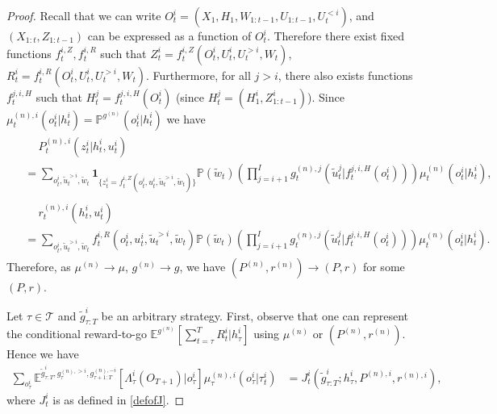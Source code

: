\documentclass[pdflatex,sn-basic]{sn-jnl}
\newcommand{\E}{\mathbb{E}}
\renewcommand{\Pr}{\mathbb{P}}
\newcommand{\es}{\enspace\enspace\:}
\theoremstyle{thmstyleone}%
\theoremstyle{thmstyletwo}%
\theoremstyle{thmstylethree}%
\begin{document}
\begin{appendices}
\begin{proof}
        {Recall that we can write $O_t^i = (X_1, H_1, W_{1:t-1}, U_{1:t-1}, U_t^{<i})$, and $(X_{1:t}, Z_{1:t-1})$ can be expressed as a function of $O_t^i$.}
        Therefore there exist fixed functions $f_t^{i, Z}, f_t^{i, R}$ such that 
			$Z_t^i = f_t^{i, Z}(O_t^i, U_t^i, U_t^{>i}, W_t)$,
			$R_t^i = f_t^{i, R}(O_t^i, U_t^i, U_t^{>i}, W_t)$. {Furthermore, for all $j>i$, there also exists functions $f_t^{j, i, H}$ such that
			$H_t^j = f_t^{j, i, H}(O_t^i)$ (since $H_t^j=(H_1^i,Z_{1:t-1}^i)$)}.
		Since $\mu_t^{(n), i}(o_t^i|h_t^i) = \Pr^{g^{(n)}}(o_t^i| h_t^i)$ we have 
		\begin{align}
  \begin{split}
			&\es P_t^{(n), i}(z_t^i|h_t^i, u_t^i) \\
			&= \sum_{o_t^i, \tilde{u}_t^{>i}, \tilde{w}_t} \bm{1}_{\{z_t^i = f_t^{i, Z}(o_t^i, u_t^i, \tilde{u}_t^{>i}, \tilde{w}_t) \} } \Pr(\tilde{w}_t) \left(\prod_{j=i+1}^I g_t^{(n), j}(\tilde{u}_t^j|f_t^{j, i, H}(o_t^i))\right) \mu_t^{(n)}(o_t^i|h_t^i),
   \end{split}\\
   \begin{split}
			&\es r_t^{(n), i}(h_t^i, u_t^i) \\
			&= \sum_{o_t^i, \tilde{u}_t^{>i}, \tilde{w}_t} f_t^{i, R}(o_t^i, u_t^i,\tilde{u}_t^{>i}, \tilde{w}_t) \Pr(\tilde{w}_t) \left(\prod_{j=i+1}^I g_t^{(n), j}(\tilde{u}_t^j|f_t^{j, i, H}(o_t^i))\right) \mu_t^{(n)}(o_t^i|h_t^i).
   \end{split}
		\end{align}
	Therefore, as $\mu^{(n)} \rightarrow \mu$, $g^{(n)}\rightarrow g$, we have $(P^{(n)}, r^{(n)} )\rightarrow (P, r)$ for some $(P, r)$.  
		
		Let $\tau\in\mathcal{T}$ and $\tilde{g}_{\tau:T}^i$ be an arbitrary strategy. First, observe that one can represent the conditional reward-to-go $\E^{g^{(n)}}[\sum_{t=\tau}^T R_t^i|h_\tau^i]$ using $\mu^{(n)}$ or $(P^{(n)}, r^{(n)})$. Hence we have
		\begin{equation}\label{eq:classicalSErtg}
		\begin{split}
			\sum_{o_\tau^i}\E^{\tilde{g}_{\tau:T}^i, g_{\tau}^{(n), >i}, g_{\tau+1:T}^{(n), -i}} [\Lambda_\tau^i(O_{T+1})|o_\tau^i]\mu_\tau^{(n), i}(o_\tau^i|\tau_t^i) 
			&= J_t^i(\tilde{g}_{\tau:T}^i; h_\tau^i, P^{(n), i}, r^{(n), i}),
		\end{split}
		\end{equation}
		where $J_t^i$ is as defined in \eqref{defofJ}.
		

\end{proof}
\end{appendices}
\end{document}
